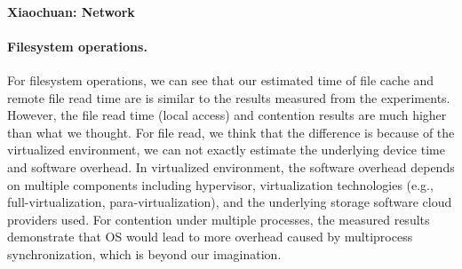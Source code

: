 \paragraph{Xiaochuan: Network}

\paragraph{Filesystem operations.} For filesystem operations, we can see that our estimated time of file cache and remote file read time are is similar to the results measured from the experiments. However, the file read time (local access) and contention results are much higher than what we thought. For file read, we think that the difference is because of the virtualized environment, we can not exactly estimate the underlying device time and software overhead. In virtualized environment, the software overhead depends on multiple components including hypervisor, virtualization technologies (e.g., full-virtualization, para-virtualization), and the underlying storage software cloud providers used. For contention under multiple processes, the measured results demonstrate that OS would lead to more overhead caused by multiprocess synchronization, which is beyond our imagination.